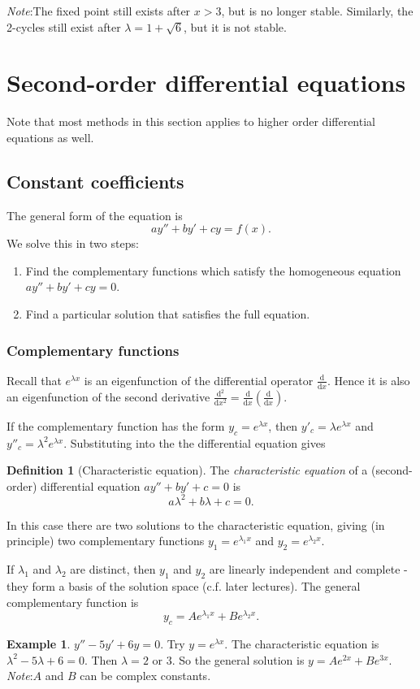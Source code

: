 \documentclass[a4paper]{article}
\theoremstyle{definition}
\newtheorem*{defi}{Definition}
\newtheorem*{eg}{Example}
\newcommand{\note}{\noindent \emph{Note}:\;}
\renewcommand{\d}{\mathrm{d}}
\let\stdsection\section
\renewcommand\section{\newpage\stdsection}
\begin{document}
\note The fixed point still exists after $x > 3$, but is no longer stable. Similarly, the 2-cycles still exist after $\lambda = 1 + \sqrt{6}$, but it is not stable.

\section{Second-order differential equations}
Note that most methods in this section applies to higher order differential equations as well.
\subsection{Constant coefficients}
The general form of the equation is 
\[
ay'' + by' + cy = f(x).
\]
We solve this in two steps:
\begin{enumerate}
\item Find the complementary functions which satisfy the homogeneous equation $ay'' + by' + cy = 0$.
\item Find a particular solution that satisfies the full equation.
\end{enumerate}
\subsubsection{Complementary functions}
Recall that $e^{\lambda x}$ is an eigenfunction of the differential operator $\frac{\d}{\d x}$. Hence it is also an eigenfunction of the second derivative $\frac{\d^2}{\d x^2} = \frac{\d}{\d x}\left(\frac{\d }{\d x}\right)$.

If the complementary function has the form $y_c = e^{\lambda x}$, then $y'_c = \lambda e^{\lambda x}$ and $y''_c = \lambda^2 e^{\lambda x}$. Substituting into the the differential equation gives
\begin{defi}[Characteristic equation]
  The \emph{characteristic equation} of a (second-order) differential equation $ay'' + by' + c = 0$ is
\[
a\lambda^2 + b\lambda + c = 0.
\]
\end{defi}

 In this case there are two solutions to the characteristic equation, giving (in principle) two complementary functions $y_1 = e^{\lambda_1 x}$ and $y_2 = e^{\lambda_2 x}$.

If $\lambda_1$ and $\lambda_2$ are distinct, then $y_1$ and $y_2$ are linearly independent and complete - they form a basis of the solution space (c.f. later lectures). The general complementary function is
\[
y_c = Ae^{\lambda_1 x} + Be^{\lambda_2 x}.
\]
\begin{eg}
  $y'' - 5y' + 6y = 0$. Try $y = e^{\lambda x}$. The characteristic equation is $\lambda^2 - 5\lambda + 6 = 0$. Then $\lambda = 2$ or $3$. So the general solution is $y = Ae^{2x} + Be^{3x}$.
\note $A$ and $B$ can be complex constants.
\end{eg}
\end{document}
